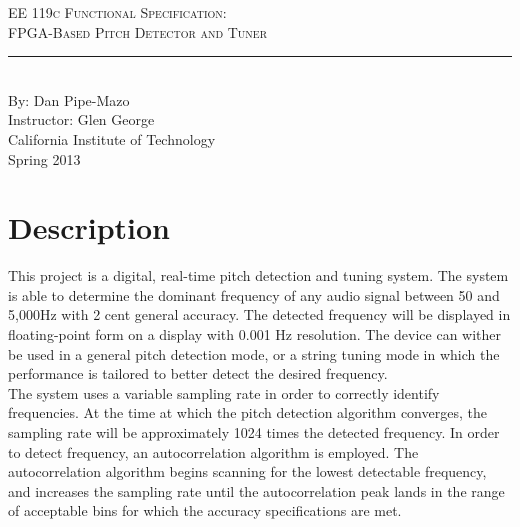 \documentclass[aps,letterpaper,10pt]{revtex4}
\newcommand{\labname}{EE 119c Functional Specification}
\newcommand{\descript}{FPGA-Based Pitch Detector and Tuner}
\newcommand{\authorname}{Dan Pipe-Mazo}
\newcommand{\professor}{Glen George}
\newcommand{\classno}{Spring 2013}
\begin{document}


\begin{titlepage}
\begin{center}
{\LARGE \textsc{\labname:} \\ \vspace{4pt}}
{\Large \textsc{\descript} \\ \vspace{4pt}} 
\rule[13pt]{\textwidth}{1pt} \\ \vspace{150pt}
{\large By: \authorname \\ \vspace{10pt}
Instructor: \professor \\ \vspace{10pt}
California Institute of Technology \\ \vspace{10pt}
\classno \\ \vspace{10pt}}
\end{center}
\end{titlepage}

\section{Description}

This project is a digital, real-time pitch detection and tuning system. The system is able to determine the dominant frequency of any audio signal between 50 and 5,000Hz with 2 cent general accuracy. The detected frequency will be displayed in floating-point form on a display with 0.001 Hz resolution. The device can wither be used in a general pitch detection mode, or a string tuning mode in which the performance is tailored to better detect the desired frequency. \\ 

The system uses a variable sampling rate in order to correctly identify frequencies. At the time at which the pitch detection algorithm converges, the sampling rate will be approximately 1024 times the detected frequency. In order to detect frequency, an autocorrelation algorithm is employed. The autocorrelation algorithm begins scanning for the lowest detectable frequency, and increases the sampling rate until the autocorrelation peak lands in the range of acceptable bins for which the accuracy specifications are met. 
\end{document}

